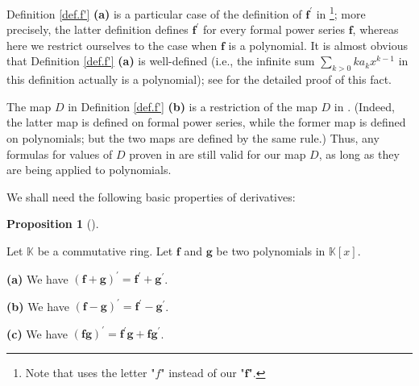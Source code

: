 \documentclass[numbers=enddot,12pt,final,onecolumn,notitlepage]{scrartcl}%
\theoremstyle{definition}
\newtheorem{prop}[theo]{Proposition}
\newenvironment{proposition}[1][]
{\begin{prop}[#1]\begin{leftbar}}
{\end{leftbar}\end{prop}}
\let\sumnonlimits\sum
\renewcommand{\sum}{\sumnonlimits\limits}
\begin{document}
Definition \ref{def.f'} \textbf{(a)} is a particular case of the definition of
$\mathbf{f}^{\prime}$ in \cite[Exercise 5]{19s-mt3s}\footnote{Note that
\cite[Exercise 5]{19s-mt3s} uses the letter "$f$" instead of our "$\mathbf{f}%
$".}; more precisely, the latter definition defines $\mathbf{f}^{\prime}$ for
every formal power series $\mathbf{f}$, whereas here we restrict ourselves to
the case when $\mathbf{f}$ is a polynomial. It is almost obvious that
Definition \ref{def.f'} \textbf{(a)} is well-defined (i.e., the infinite sum
$\sum_{k>0}ka_{k}x^{k-1}$ in this definition actually is a polynomial); see
\cite[Exercise 5 \textbf{(a)}]{19s-mt3s} for the detailed proof of this fact.

The map $D$ in Definition \ref{def.f'} \textbf{(b)} is a restriction of the
map $D$ in \cite[Exercise 5]{19s-mt3s}. (Indeed, the latter map is defined on
formal power series, while the former map is defined on polynomials; but the
two maps are defined by the same rule.) Thus, any formulas for values of $D$
proven in \cite{19s-mt3s} are still valid for our map $D$, as long as they are
being applied to polynomials.

We shall need the following basic properties of derivatives:

\begin{proposition}
\label{prop.f'.leib}Let $\mathbb{K}$ be a commutative ring. Let $\mathbf{f}$
and $\mathbf{g}$ be two polynomials in $\mathbb{K}\left[  x\right]  $.

\textbf{(a)} We have $\left(  \mathbf{f}+\mathbf{g}\right)  ^{\prime
}=\mathbf{f}^{\prime}+\mathbf{g}^{\prime}$.

\textbf{(b)} We have $\left(  \mathbf{f}-\mathbf{g}\right)  ^{\prime
}=\mathbf{f}^{\prime}-\mathbf{g}^{\prime}$.

\textbf{(c)} We have $\left(  \mathbf{fg}\right)  ^{\prime}=\mathbf{f}%
^{\prime}\mathbf{g}+\mathbf{fg}^{\prime}$.
\end{proposition}
\end{document}
